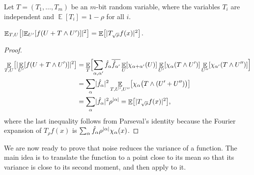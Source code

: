\documentclass{toc}
\def\hf{\hat f}
\DeclarePairedDelimiter{\abs}{\lvert}{\rvert}
\DeclareMathOperator*{\E}{\mathbb{E}}                 %
\begin{document}
  Let $T = (T_1, \ldots, T_m)$ be an  %
  $m$-bit  %
 random variable,  %
  where the variables $T_i$ are independent and $\E[T_i]=1-\rho$ for all $i$.
  \begin{claim} \label{claim:decouple-noise}
    $\E_{T,U} \bigl[ \abs{\E_{U'}[f(U + T \wedge U')]}^2 \bigr] = \E \bigl[ \abs{T_{\sqrt{\rho}}f(x)}^2 \bigr]$.
  \end{claim}
  \begin{proof}
    \begin{align*}
      \E_{T,U} \bigl[ \abs{\E_{U'}[f(U + T \wedge U')]}^2 \bigr]
      &= \E_T \Bigl[ \sum_{\alpha,\alpha'} \hf_{\alpha} \overline{\hf_{\alpha'}} \E_U[\chi_{\alpha + \alpha'}(U)] \E_{U'}[\chi_\alpha(T \wedge U')] \E_{U''}[\chi_{\alpha'}(T \wedge U'')] \Bigr] \\
      &= \sum_{\alpha} \abs{\hf_{\alpha}}^2 \E_{T,U',U''} \bigl[\chi_\alpha \bigl(T \wedge (U' + U'') \bigr) \bigr] \\
      &= \sum_{\alpha} \abs{\hf_{\alpha}}^2 \rho^{\abs{\alpha}} 
      = \E \bigl[ \abs{T_{\sqrt{\rho}}f(x)}^2 \bigr] ,
    \end{align*}
    where the last inequality follows from Parseval's identity because the Fourier expansion of $T_\rho f(x)$ is $\sum_\alpha \hf_\alpha \rho^{\abs{\alpha}} \chi_\alpha(x)$.
  \end{proof}

  We are now ready to prove that noise reduces the variance of a function.
  The main idea is to translate the function to a point close to its mean so that its variance is close to its second moment, and then apply  to it.
\end{document}
